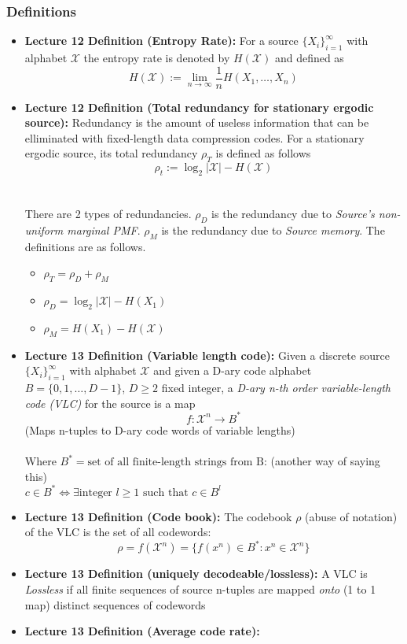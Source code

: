 \documentclass{article}
\begin{document}
\subsubsection{Definitions}
\begin{itemize}
    \item \textbf{Lecture 12 Definition (Entropy Rate):} For a source \(\{X_i\}^\infty_{i=1}\) with alphabet \(\mathcal{X}\) the entropy rate is denoted by \(H(\mathcal{X})\) and defined as
    \[H(\mathcal{X}) := \lim_{n \to \infty} \frac{1}{n} H(X_1, \ldots, X_n)\]
    \item \textbf{Lecture 12 Definition (Total redundancy for stationary ergodic source): } Redundancy is the amount of useless information that can be elliminated with fixed-length data compression codes.
    For a stationary ergodic source, its total redundancy \(\rho_T\) is defined as follows
    \[\rho_t := \log_2 |\mathcal{X}| - H(\mathcal{X})\]
    \\ \\
    There are 2 types of redundancies. \(\rho_D\) is the redundancy due to \textit{Source's non-uniform marginal PMF}. \(\rho_M\) is the redundancy due to \textit{Source memory}. The definitions are as follows.

    \begin{itemize}
        \item \(\rho_T = \rho_D + \rho_M\)
        \item \(\rho_D = \log_2 |\mathcal{X}| - H(X_1)\)
        \item \(\rho_M = H(X_1) - H(\mathcal{X})\)
    \end{itemize}
    \item \textbf{Lecture 13 Definition (Variable length code): } Given a discrete source \(\{X_i\}^\infty_{i=1}\) with alphabet \(\mathcal{X}\) and given a D-ary code alphabet \(B = \{0,1,\ldots, D-1\}\), \(D \geq 2\) fixed integer, a \textit{D-ary n-th order variable-length code (VLC)} for the source is a map
    \[f: \mathcal{X}^n \to B^*\]
    (Maps n-tuples to D-ary code words of variable lengths)
    \\ \\Where  \(B^* = \text{set of all finite-length strings from B}\): (another way of saying this) \\ \(c \in B^* \Leftrightarrow \exists \text{integer } l\geq1 \text{ such that } c \in B^l \)
    \item \textbf{Lecture 13 Definition (Code book): } The codebook \(\rho\) (abuse of notation) of the VLC is the set of all codewords:
    \[\rho = f(\mathcal{X}^n) = \{f(x^n) \in B^* : x^n \in \mathcal{X}^n\}\]
    \item \textbf{Lecture 13 Definition (uniquely decodeable/lossless):} A VLC is \textit{Lossless} if all finite sequences of source n-tuples are mapped \textit{onto} (1 to 1 map) distinct sequences of codewords
    \item \textbf{Lecture 13 Definition (Average code rate): } 
\end{itemize}
\end{document}
